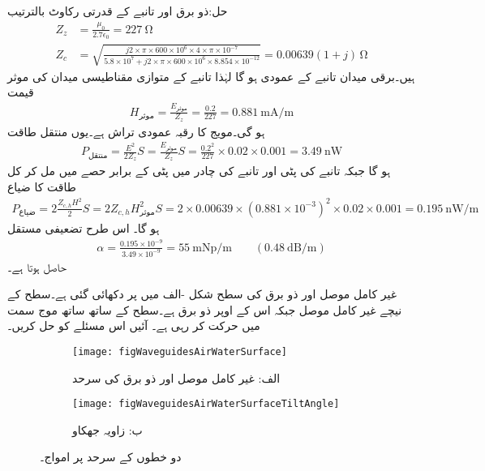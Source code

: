 حل:ذو برق  اور تانبے کے قدرتی رکاوٹ بالترتیب
\begin{align*}
Z_z&=\frac{\mu_0}{2.7 \epsilon_0}=\SI{227}{\ohm}\\
Z_c&=\sqrt{\frac{j 2 \times \pi \times 600 \times 10^{6} \times 4 \times \pi \times 10^{-7}}{5.8\times 10^{7}+j 2\times \pi \times 600 \times 10^{6} \times 8.854 \times 10^{-12}}}=0.00639(1+j) \, \si{\ohm}
\end{align*}
ہیں۔برقی میدان تانبے کے عمودی ہو گا لہٰذا تانبے کے متوازی مقناطیسی میدان کی موثر قیمت
\begin{align*}
H_{\text{موثر}} = \frac{E_{\text{موثر}}}{Z_z} =\frac{0.2}{227}=\SI{0.881}{\milli \ampere\per\meter}
\end{align*}
ہو گی۔مویج کا رقبہ عمودی تراش  ہے۔یوں   منتقل طاقت
\begin{align*}
P_{\text{منتقل}}=\frac{E^2}{2 Z_z}  S=\frac{E_{\text{موثر}}}{Z_z}  S=\frac{0.2^2}{227}\times 0.02 \times 0.001 =\SI{3.49}{\nano\watt}
\end{align*}
 ہو گا جبکہ تانبے کی پٹی اور تانبے کی چادر  میں پٹی کے برابر حصے میں مل کر کل طاقت کا ضیاع
\begin{align*}
P_{\text{ضیاع}}= 2\frac{Z_{c,h} H^2}{2} S=2Z_{c,h} H^2_{\text{موثر}} S =2\times 0.00639 \times \left(0.881 \times 10^{-3}\right)^2 \times 0.02\times 0.001=\SI{0.195}{\nano\watt\per\meter}
\end{align*}
ہو گا۔ اس طرح تضعیفی مستقل
\begin{align*}
\alpha=\frac{0.195\times 10^{-9}}{3.49\times 10^{-9}}=\SI{55}{\milli\neper\per\meter} \quad \quad \left(\SI{0.48}{\deci\bel\per\meter}\right)
\end{align*}
حاصل ہوتا ہے۔

غیر کامل موصل اور ذو برق کی سطح شکل -الف میں   پر دکھائی گئی ہے۔سطح کے نیچے   غیر کامل موصل جبکہ اس کے اوپر  ذو برق ہے۔سطح کے ساتھ ساتھ  موج   سمت میں حرکت کر رہی ہے۔ آئیں اس مسئلے کو حل کریں۔

\begin{figure}
\centering
\begin{subfigure}{0.4\textwidth}
\centering
\texttt{[image: figWaveguidesAirWaterSurface]}
\caption*{الف: غیر کامل موصل اور ذو برق کی سرحد}
\end{subfigure}%
%
\begin{subfigure}{0.4\textwidth}
\centering
\texttt{[image: figWaveguidesAirWaterSurfaceTiltAngle]}
\caption*{ب: زاویہ جھکاو}
\end{subfigure}
\caption{دو خطوں کے سرحد پر امواج۔}
\label{شکل_مویج_ہوا_غیر_کامل_ذو_برق_سرحد}
\end{figure}

